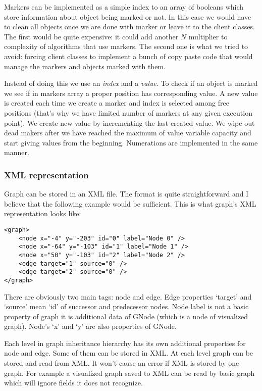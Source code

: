 \documentclass[11pt,a4paper]{article}
\begin{document}
Markers can be implemented as a simple index to an array of booleans which store information about object being marked or not. In this case we would have to clean all objects once we are done with marker or leave it to the client classes. The first would be quite expensive: it could add another $N$ multiplier to complexity of algorithms that use markers. The second one is what we tried to avoid: forcing client classes to implement a bunch of copy paste code that would manage the markers and objects marked with them.

Instead of doing this we use an \emph{index} and a \emph{value}. To check if an object is marked we see if in markers array a proper position has corresponding value. A new value is created each time we create a marker and index is selected among free positions (that's why we have limited number of markers at any given execution point). We create new value by incrementing the last created value. We wipe out dead makers after we have reached the maximum of value variable capacity and start giving values from the beginning. Numerations are implemented in the same manner.

\subsubsection{XML representation}
Graph can be stored in an XML file. The format is quite straightforward and I believe that the following example would be sufficient. This is what graph's XML representation looks like:
\begin{lstlisting}
<graph>
    <node x="-4" y="-203" id="0" label="Node 0" />
    <node x="-64" y="-103" id="1" label="Node 1" />
    <node x="50" y="-103" id="2" label="Node 2" />
    <edge target="1" source="0" />
    <edge target="2" source="0" />
</graph>
\end{lstlisting}
There are obviously two main tags: node and edge. Edge properties `target' and `source' mean `id' of successor and predecessor nodes. Node label is not a basic property of graph it is additional data of GNode (which is a node of visualized graph). Node's `x' and `y' are also properties of GNode.

Each level in graph inheritance hierarchy has its own additional properties for node and edge. Some of them can be stored in XML. At each level graph can be stored and read from XML. It won't cause an error if XML is stored by one graph. For example a visualized graph saved to XML can be read by basic graph which will ignore fields it does not recognize.
\end{document}
